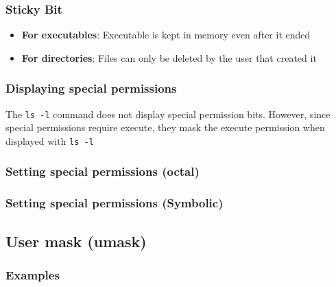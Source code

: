 \documentclass{report}
\begin{document}
    \bigbreak \noindent 
    \subsubsection{Sticky Bit}
    \bigbreak \noindent 
    \begin{concept}
       \begin{itemize}
           \item \textbf{For executables}: Executable is kept in memory even after it ended
            \item \textbf{For directories}: Files can only be deleted by the user that created it 
       \end{itemize} 
    \end{concept}

    \bigbreak \noindent 
    \subsubsection{Displaying special permissions}
    \bigbreak \noindent 
    \begin{concept}
        The \texttt{ls -l}  command does not display special permission bits. However, since special permissions require execute, they mask the execute permission when displayed with \texttt{ls -l}
    \end{concept}

    \bigbreak \noindent 
    \subsubsection{Setting special permissions (octal)}
    \bigbreak \noindent 

    \pagebreak 
    \subsubsection{Setting special permissions (Symbolic)}
    \bigbreak \noindent 

    \bigbreak \noindent 
    \subsection{User mask (umask)}
    \bigbreak \noindent 

    \pagebreak 
    \subsubsection{Examples}
    \bigbreak \noindent 
\end{document}

